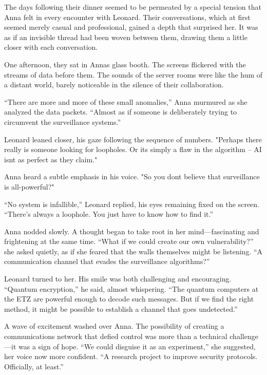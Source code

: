 \documentclass[
]{article}
\begin{document}
The days following their dinner seemed to be permeated by a special tension that Anna felt in every encounter with Leonard. Their conversations, which at first seemed merely casual and professional, gained a depth that surprised her. It was as if an invisible thread had been woven between them, drawing them a little closer with each conversation.

One afternoon, they sat in Anna\textquotesingle s glass booth. The screens flickered with the streams of data before them. The sounds of the server rooms were like the hum of a distant world, barely noticeable in the silence of their collaboration.

``There are more and more of these small anomalies,'' Anna murmured as she analyzed the data packets. ``Almost as if someone is deliberately trying to circumvent the surveillance systems.''

Leonard leaned closer, his gaze following the sequence of numbers. "Perhaps there really is someone looking for loopholes. Or it\textquotesingle s simply a flaw in the algorithm -- AI isn\textquotesingle t as perfect as they claim."

Anna heard a subtle emphasis in his voice. "So you don\textquotesingle t believe that surveillance is all-powerful?"

``No system is infallible,'' Leonard replied, his eyes remaining fixed on the screen. ``There's always a loophole. You just have to know how to find it.''

Anna nodded slowly. A thought began to take root in her mind---fascinating and frightening at the same time. ``What if we could create our own vulnerability?'' she asked quietly, as if she feared that the walls themselves might be listening. ``A communication channel that evades the surveillance algorithms?''

Leonard turned to her. His smile was both challenging and encouraging. ``Quantum encryption,'' he said, almost whispering. ``The quantum computers at the ETZ are powerful enough to decode such messages. But if we find the right method, it might be possible to establish a channel that goes undetected.''

A wave of excitement washed over Anna. The possibility of creating a communications network that defied control was more than a technical challenge---it was a sign of hope. ``We could disguise it as an experiment,'' she suggested, her voice now more confident. ``A research project to improve security protocols. Officially, at least.''
\end{document}
